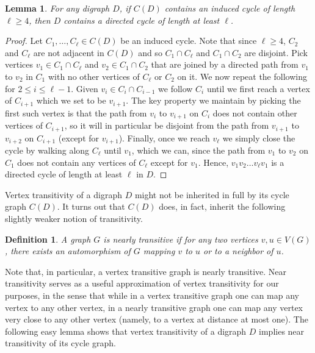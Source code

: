 \documentclass[english,11pt]{article}
\newtheorem{lemma}[theorem]{Lemma}
\newtheorem{definition}[theorem]{Definition}
\theoremstyle{definition}
\numberwithin{equation}{section}
\numberwithin{figure}{section}
\begin{document}
\begin{lemma}\label{lem:induced-to-directed-cycles}
For any digraph $D$, if $C(D)$ contains an induced cycle of length $\ell\ge 4$, then $D$ contains a directed cycle of length at least $\ell$.
\end{lemma}
\begin{proof}

Let $C_1,\ldots, C_\ell \in C(D)$ be an induced cycle. Note that since $\ell \ge 4$, $C_2$ and $C_{\ell}$ are not adjacent in $C(D)$ and so $C_1 \cap C_\ell$ and $C_1 \cap C_2$ are disjoint. Pick vertices $v_1 \in C_1 \cap C_{\ell}$ and $v_2 \in C_1 \cap C_2$ that are joined by a directed path from $v_1$ to $v_2$ in $C_1$ with no other vertices of $C_\ell$ or $C_2$ on it. We now repeat the following for $2 \le i \le \ell-1$. Given $v_i \in C_{i} \cap C_{i-1}$ we follow $C_i$ until we first reach a vertex of $C_{i+1}$ which we set to be $v_{i+1}$. The key property we maintain by picking the first such vertex is that the path from $v_{i}$ to $v_{i+1}$ on $C_{i}$ does not contain other vertices of $C_{i+1}$, so it will in particular be disjoint from the path from $v_{i+1}$ to $v_{i+2}$ on $C_{i+1}$ (except for $v_{i+1}$). Finally, once we reach $v_{\ell}$ we simply close the cycle by walking along $C_{\ell}$ until $v_1$, which we can, since the path from $v_1$ to $v_2$ on $C_1$ does not contain any vertices of $C_{\ell}$ except for $v_1$. Hence, $v_1v_2\ldots v_{\ell}v_1$ is a directed cycle of length at least $\ell$ in $D$. 
\end{proof}


Vertex transitivity of a digraph $D$ might not be inherited in full by its cycle graph $C(D)$. It turns out that $C(D)$ does, in fact, inherit the following slightly weaker notion of transitivity. 

\begin{definition}\label{defn:near-transitive}
A graph $G$ is \emph{nearly transitive} if for any two vertices $v,u \in V(G)$, there exists an automorphism of $G$ mapping $v$ to $u$ or to a neighbor of $u$.
\end{definition}

Note that, in particular, a vertex transitive graph is nearly transitive. 
Near transitivity serves as a useful approximation of vertex transitivity for our purposes, in the sense that while in a vertex transitive graph one can map any vertex to any other vertex, in a nearly transitive graph one can map any vertex very close to any other vertex (namely, to a vertex at distance at most one). The following easy lemma shows that vertex transitivity of a digraph $D$ implies near transitivity of its cycle graph.
\end{document}
